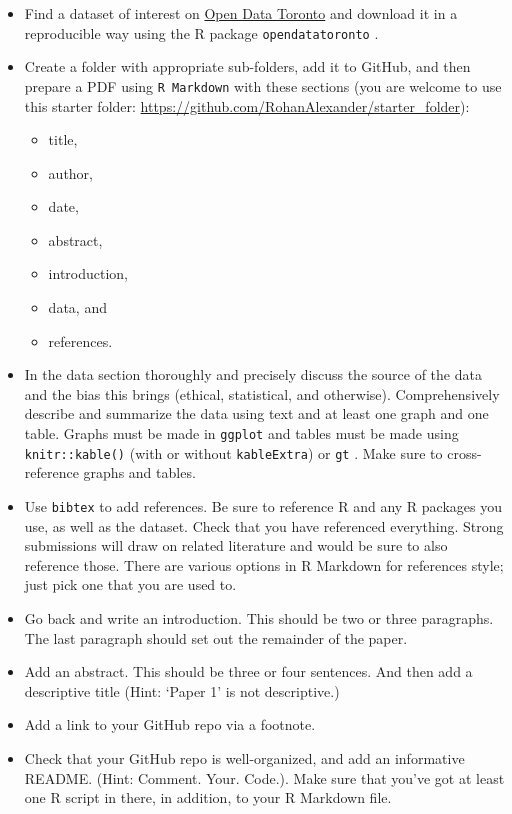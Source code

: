 \documentclass[
]{book}
\providecommand{\tightlist}{%
  \setlength{\itemsep}{0pt}\setlength{\parskip}{0pt}}
\begin{document}
\begin{itemize}
\tightlist
\item
  Find a dataset of interest on \href{https://open.toronto.ca}{Open Data Toronto} and download it in a reproducible way using the R package \texttt{opendatatoronto} \citep{citeSharla}.
\item
  Create a folder with appropriate sub-folders, add it to GitHub, and then prepare a PDF using \texttt{R\ Markdown} with these sections (you are welcome to use this starter folder: \url{https://github.com/RohanAlexander/starter_folder}):

  \begin{itemize}
  \tightlist
  \item
    title,
  \item
    author,
  \item
    date,
  \item
    abstract,
  \item
    introduction,
  \item
    data, and
  \item
    references.
  \end{itemize}
\item
  In the data section thoroughly and precisely discuss the source of the data and the bias this brings (ethical, statistical, and otherwise). Comprehensively describe and summarize the data using text and at least one graph and one table. Graphs must be made in \texttt{ggplot} \citep{citeggplot} and tables must be made using \texttt{knitr::kable()} (with or without \texttt{kableExtra}) or \texttt{gt} \citep{citeGT}. Make sure to cross-reference graphs and tables.
\item
  Use \texttt{bibtex} to add references. Be sure to reference R and any R packages you use, as well as the dataset. Check that you have referenced everything. Strong submissions will draw on related literature and would be sure to also reference those. There are various options in R Markdown for references style; just pick one that you are used to.
\item
  Go back and write an introduction. This should be two or three paragraphs. The last paragraph should set out the remainder of the paper.
\item
  Add an abstract. This should be three or four sentences. And then add a descriptive title (Hint: `Paper 1' is not descriptive.)
\item
  Add a link to your GitHub repo via a footnote.
\item
  Check that your GitHub repo is well-organized, and add an informative README. (Hint: Comment. Your. Code.). Make sure that you've got at least one R script in there, in addition, to your R Markdown file.

\end{itemize}
\end{document}
